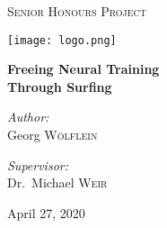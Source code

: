 \begin{titlepage}
	\centering
	
	{\scshape\LARGE Senior Honours Project\par}
	\vspace{0.25cm}
	{\texttt{[image: logo.png]} \par}
	\vspace{0.25cm}
	{\huge\bfseries Freeing Neural Training\\Through Surfing\par}
	\vspace{0.5cm}

	\vfill

	\noindent
	\begin{minipage}{0.45\textwidth}
		\begin{center} \large
		  \textit{Author:}\\
          Georg \textsc{Wölflein}\\
		\end{center}
    \end{minipage}%
    \begin{minipage}{0.45\textwidth}
		\begin{center} \large
		\textit{Supervisor:} \\
		Dr.~Michael \textsc{Weir}
		\end{center}
	\end{minipage}%

	\vfill

	{April 27, 2020\par}
\end{titlepage}

